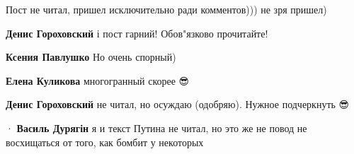 \begin{itemize}
 
Пост не читал, пришел исключительно ради комментов))) не зря пришел)

\begin{itemize}
 
\textbf{Денис Гороховский} і пост гарний! Обов"язково прочитайте!

 
\textbf{Ксения Павлушко} Но очень спорный)

 
\textbf{Елена Куликова} многогранный скорее 😎

 
\textbf{Денис Гороховский} не читал, но осуждаю (одобряю). Нужное подчеркнуть 😎

 
  · 
\textbf{Василь Дурягін} я и текст Путина не читал, но это же не повод не восхищаться от того, как бомбит у некоторых

 

\end{itemize}
\end{itemize}
